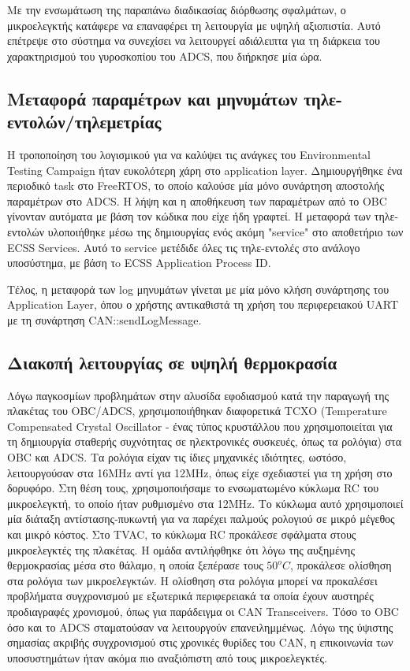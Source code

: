 \documentclass[a4paper,nobib,justified]{tufte-book}
\begin{document}
	Με την ενσωμάτωση της παραπάνω διαδικασίας διόρθωσης σφαλμάτων, ο μικροελεγκτής κατάφερε να επαναφέρει τη λειτουργία με υψηλή αξιοπιστία. Αυτό επέτρεψε στο σύστημα να συνεχίσει να λειτουργεί αδιάλειπτα για τη διάρκεια του χαρακτηρισμού του γυροσκοπίου του ADCS, που διήρκησε μία ώρα.

	\subsection{Μεταφορά παραμέτρων και μηνυμάτων τηλε-εντολών/τηλεμετρίας}
	Η τροποποίηση του λογισμικού για να καλύψει τις ανάγκες του Environmental Testing Campaign ήταν ευκολότερη χάρη στο application layer. Δημιουργήθηκε ένα περιοδικό task στο FreeRTOS, το οποίο καλούσε μία μόνο συνάρτηση αποστολής παραμέτρων στο ADCS. Η λήψη και η αποθήκευση των παραμέτρων από το OBC γίνονταν αυτόματα με βάση τον κώδικα που είχε ήδη γραφτεί. Η μεταφορά των τηλε-εντολών υλοποιήθηκε μέσω της δημιουργίας ενός ακόμη "service" στο αποθετήριο των ECSS Services. Αυτό το service μετέδιδε όλες τις τηλε-εντολές στο ανάλογο υποσύστημα, με βάση τo ECSS Application Process ID.

	Τέλος, η μεταφορά των log μηνυμάτων γίνεται με μία μόνο κλήση συνάρτησης του Application Layer, όπου ο χρήστης αντικαθιστά τη χρήση του περιφερειακού UART με τη συνάρτηση CAN::sendLogMessage.
	\subsection{Διακοπή λειτουργίας σε υψηλή θερμοκρασία}
	Λόγω παγκοσμίων προβλημάτων στην αλυσίδα εφοδιασμού κατά την παραγωγή της πλακέτας του OBC/ADCS, χρησιμοποιήθηκαν διαφορετικά TCXO (Temperature Compensated Crystal Oscillator - ένας τύπος κρυστάλλου που χρησιμοποιείται για τη δημιουργία σταθερής συχνότητας σε ηλεκτρονικές συσκευές, όπως τα ρολόγια) στα OBC και ADCS. Τα ρολόγια είχαν τις ίδιες μηχανικές ιδιότητες, ωστόσο, λειτουργούσαν στα 16MHz αντί για 12MHz, όπως είχε σχεδιαστεί για τη χρήση στο δορυφόρο. Στη θέση τους, χρησιμοποιήσαμε το ενσωματωμένο κύκλωμα RC του μικροελεγκτή, το οποίο ήταν ρυθμισμένο στα 12MHz. Το κύκλωμα αυτό χρησιμοποιεί μία διάταξη αντίστασης-πυκωντή για να παρέχει παλμούς ρολογιού σε μικρό μέγεθος και μικρό κόστος. Στο TVAC, το κύκλωμα RC προκάλεσε σφάλματα στους μικροελεγκτές της πλακέτας. Η ομάδα αντιλήφθηκε ότι λόγω της αυξημένης θερμοκρασίας μέσα στο θάλαμο, η οποία ξεπέρασε τους $50^o C$, προκάλεσε ολίσθηση στα ρολόγια των μικροελεγκτών. Η ολίσθηση στα ρολόγια μπορεί να προκαλέσει προβλήματα συγχρονισμού με εξωτερικά περιφερειακά τα οποία έχουν αυστηρές προδιαγραφές χρονισμού, όπως για παράδειγμα οι CAN Transceivers. Τόσο το OBC όσο και το ADCS σταματούσαν να λειτουργούν επανειλημμένως. Λόγω της ύψιστης σημασίας ακριβής συγχρονισμού στις χρονικές θυρίδες του CAN, η επικοινωνία των υποσυστημάτων ήταν ακόμα πιο αναξιόπιστη από τους μικροελεγκτές.
\end{document}
